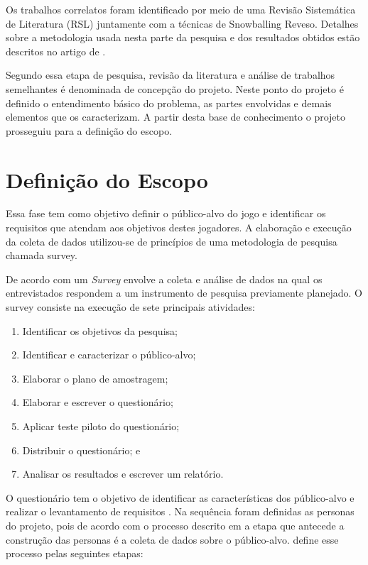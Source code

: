 Os trabalhos correlatos foram identificado por meio de uma Revisão Sistemática de Literatura (RSL) juntamente com a técnicas de Snowballing Reveso. Detalhes sobre a metodologia usada nesta parte da pesquisa e dos resultados obtidos estão descritos no artigo de .

Segundo  essa etapa de pesquisa, revisão da literatura e análise de trabalhos semelhantes é denominada de concepção do projeto. Neste ponto do projeto é definido o entendimento básico do problema, as partes envolvidas e demais elementos que os caracterizam. A partir desta base de conhecimento o projeto prosseguiu para a definição do escopo.

\section{Definição do Escopo}

Essa fase tem como objetivo definir o público-alvo do jogo e identificar os requisitos que atendam aos objetivos destes jogadores. A elaboração e execução da coleta de dados utilizou-se de princípios de uma metodologia de pesquisa chamada survey. 

De acordo com  um \textit{Survey} envolve a coleta e análise de dados na qual os entrevistados respondem a um instrumento de pesquisa previamente planejado. O survey consiste na execução de sete principais atividades:

\begin{enumerate}
    \item Identificar os objetivos da pesquisa;
    \item Identificar e caracterizar o público-alvo;
    \item Elaborar o plano de amostragem;
    \item Elaborar e escrever o questionário;
    \item Aplicar teste piloto do questionário;
    \item Distribuir o questionário; e
    \item Analisar os resultados e escrever um relatório.
\end{enumerate}

O questionário tem o objetivo de identificar as características dos público-alvo e realizar o levantamento de requisitos \cite[p. 128]{Pressman_2000}. Na sequência foram definidas as personas do projeto, pois de acordo com o processo descrito em \citeauthor{usability2020} a etapa que antecede a construção das personas é a coleta de dados sobre o público-alvo.  define esse processo pelas seguintes etapas:

